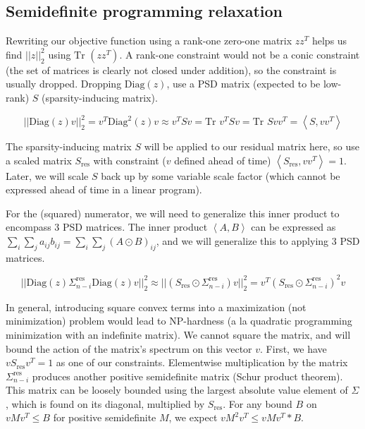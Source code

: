 \documentclass{article}
\begin{document}
\subsection{Semidefinite programming relaxation}

Rewriting our objective function using a rank-one zero-one matrix $z z^T$ helps us find $||z||_2^2$ using $\text{Tr }(z z^T)$. A rank-one constraint would not be a conic constraint (the set of matrices is clearly not closed under addition), so the constraint is usually dropped. Dropping $\text{Diag}(z)$, use a PSD matrix (expected to be low-rank) $S$ (sparsity-inducing matrix).

$$|| \text{Diag}(z) v ||_2^2 = v^T \text{Diag}^2(z) v
\approx
v^T S v
= \text{Tr } v^T S v = \text{Tr } S v v^T = \left< S, v v^T \right>
$$

The sparsity-inducing matrix $S$ will be applied to our residual matrix here, so use a scaled matrix $S_\text{res}$ with constraint ($v$ defined ahead of time) $\left< S_\text{res}, v v^T \right> = 1$. Later, we will scale $S$ back up by some variable scale factor (which cannot be expressed ahead of time in a linear program).

For the (squared) numerator, we will need to generalize this inner product to encompass 3 PSD matrices. The inner product $\left< A, B \right>$ can be expressed as $\sum_i \sum_j a_{ij} b_{ij} = \sum_i \sum_j (A \odot B)_{ij}$, and we will generalize this to applying 3 PSD matrices.

$$
|| \text{Diag}(z) \Sigma_{n-i}^\text{res} \text{Diag}(z) v ||_2^2
\approx
|| (S_\text{res} \odot \Sigma_{n-i}^\text{res}) v ||_2^2
= v^T (S_\text{res} \odot \Sigma_{n-i}^\text{res})^2 v
$$

In general, introducing square convex terms into a maximization (not minimization) problem would lead to NP-hardness (a la quadratic programming minimization with an indefinite matrix). We cannot square the matrix, and will bound the action of the matrix's spectrum on this vector $v$. First, we have $v S_\text{res} v^T = 1$ as one of our constraints. Elementwise multiplication by the matrix $\Sigma_{n-i}^\text{res}$ produces another positive semidefinite matrix (Schur product theorem). This matrix can be loosely bounded using the largest absolute value element of $\Sigma$, which is found on its diagonal, multiplied by $S_\text{res}$. For any bound $B$ on $v M v^T \le B$ for positive semidefinite $M$, we expect $v M^2 v^T \le v M v^T * B$.
\end{document}
